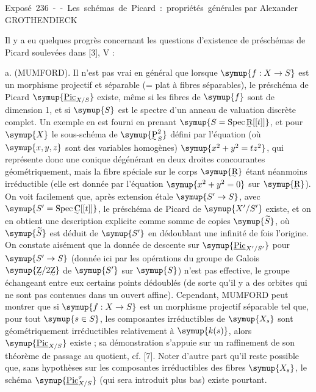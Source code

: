 \unit{Exposé 236 -- Les schémas de Picard : propriétés générales}
%
  {par Alexander GROTHENDIECK}


Il y a eu quelques progrès concernant les questions d'existence de préschémas
de Picard soulevées dans [3], V :

\medskip
\noindent a. (MUMFORD). Il n'est pas vrai en général que lorsque
$\symup{f:X\to S}$ est un morphisme projectif et séparable (= plat à
fibres séparables), le préschéma de Picard $\symup{\underline{\operatorname{Pic}}_{X/S}}$ existe,
même si les fibres de $\symup{f}$ sont de dimension 1, et si $\symup{S}$ est le spectre d'un
anneau de valuation discrète complet. Un exemple en est fourni en prenant
$\symup{S=\operatorname{Spec}\text{\uwave{R}}[[t]]}$, et pour $\symup{X}$ le sous-schéma de
$\symup{\text{\uwave{P}}^2_S}$ défini par l'équation (où $\symup{x,y,z}$ sont des variables
homogènes) $\symup{x^2+y^2=tz^2}$,
qui représente donc une conique dégénérant en deux droites concourantes
géométriquement, mais la fibre spéciale sur le corps $\symup{\text{\uwave{R}}}$ étant
néanmoins irréductible (elle est donnée par l'équation $\symup{x^2+y^2=0}$ sur
$\symup{\text{\uwave{R}}}$). On voit facilement que, après extension étale
$\symup{S'\to S}$, avec $\symup{S'=\operatorname{Spec}\text{\uwave{C}}[[t]]}$, le
préschéma de Picard de $\symup{X'/S'}$ existe, et on en obtient une description
explicite comme somme de copies $\symup{\widetilde S}$, où $\symup{\widetilde S}$ est déduit de
$\symup{S'}$ en dédoublant une infinité de fois l'origine. On constate aisément que la
donnée de descente sur $\symup{\underline{\operatorname{Pic}}_{X'/S'}}$ pour
$\symup{S'\to S}$ (donnée ici par les opérations du groupe de Galois
$\symup{\text{\uwave{Z}}/2\text{\uwave{Z}}}$ de $\symup{S'}$ sur $\symup{S}$) n'est pas effective, le groupe
échangeant entre eux certains points dédoublés (de sorte qu'il y a des orbites
qui ne sont pas contenues dans un ouvert affine). Cependant, MUMFORD peut
montrer que si $\symup{f:X\to S}$ est un morphisme projectif séparable tel
que, pour tout $\symup{s\in S}$, les composantes irréductibles de $\symup{X_s}$ sont
géométriquement irréductibles relativement à $\symup{k(s)}$, alors
$\symup{\underline{\operatorname{Pic}}_{X/S}}$ existe ; sa démonstration s'appuie sur un
raffinement de son théorème de passage au quotient, cf. [7]. Noter d'autre part
qu'il reste possible que, sans hypothèses sur les composantes irréductibles des
fibres $\symup{X_s}$, le schéma $\symup{\underline{\operatorname{Pic}}^{\tau}_{X/S}}$ (qui sera introduit
plus bas) existe pourtant.


